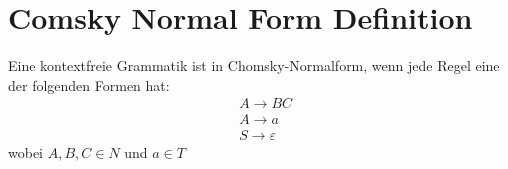 \documentclass[t]{beamer}
\begin{document}


	\section{Comsky Normal Form Definition}\label{sec:comsky-normal-form-definition}
	\begin{frame}
		Eine kontextfreie Grammatik ist in Chomsky-Normalform, wenn jede Regel eine der folgenden Formen hat:
		\begin{align*}
			& A \rightarrow BC \\
			& A \rightarrow a \\
			& S \rightarrow \varepsilon
		\end{align*}
		wobei $A,B,C \in N$ und $a \in T$
	\end{frame}
\end{document}
